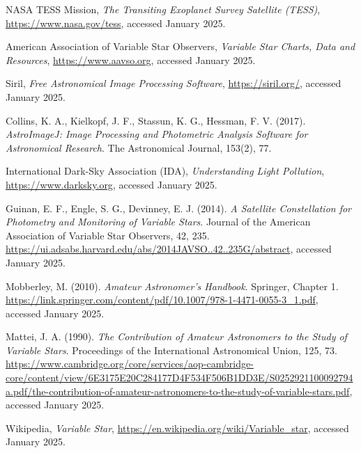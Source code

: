 \documentclass[12pt,a4paper]{article}
\begin{document}
\begin{thebibliography}{9}

    NASA TESS Mission,
    \textit{The Transiting Exoplanet Survey Satellite (TESS)}, 
    \url{https://www.nasa.gov/tess}, accessed January 2025.
    
    American Association of Variable Star Observers,
    \textit{Variable Star Charts, Data and Resources}, 
    \url{https://www.aavso.org}, accessed January 2025.
    
    Siril,
    \textit{Free Astronomical Image Processing Software},
    \url{https://siril.org/}, accessed January 2025.
    
    Collins, K. A., Kielkopf, J. F., Stassun, K. G., Hessman, F. V. (2017). 
    \textit{AstroImageJ: Image Processing and Photometric Analysis Software for Astronomical Research}.
    The Astronomical Journal, 153(2), 77.
    
    International Dark-Sky Association (IDA), 
    \textit{Understanding Light Pollution}, 
    \url{https://www.darksky.org}, accessed January 2025.
    
    
    Guinan, E. F., Engle, S. G., Devinney, E. J. (2014). 
    \textit{A Satellite Constellation for Photometry and Monitoring of Variable Stars}. 
    Journal of the American Association of Variable Star Observers, 42, 235. 
    \url{https://ui.adsabs.harvard.edu/abs/2014JAVSO..42..235G/abstract}, accessed January 2025.
    
    Mobberley, M. (2010). 
    \textit{Amateur Astronomer's Handbook}. 
    Springer, Chapter 1. 
    \url{https://link.springer.com/content/pdf/10.1007/978-1-4471-0055-3_1.pdf}, accessed January 2025.
    
    Mattei, J. A. (1990). 
    \textit{The Contribution of Amateur Astronomers to the Study of Variable Stars}.
    Proceedings of the International Astronomical Union, 125, 73. 
    \url{https://www.cambridge.org/core/services/aop-cambridge-core/content/view/6E3175E20C284177D4F534F506B1DD3E/S0252921100092794a.pdf/the-contribution-of-amateur-astronomers-to-the-study-of-variable-stars.pdf}, accessed January 2025.
    
Wikipedia,
\textit{Variable Star}, 
\url{https://en.wikipedia.org/wiki/Variable_star}, accessed January 2025.

    
    \end{thebibliography}
\end{document}
